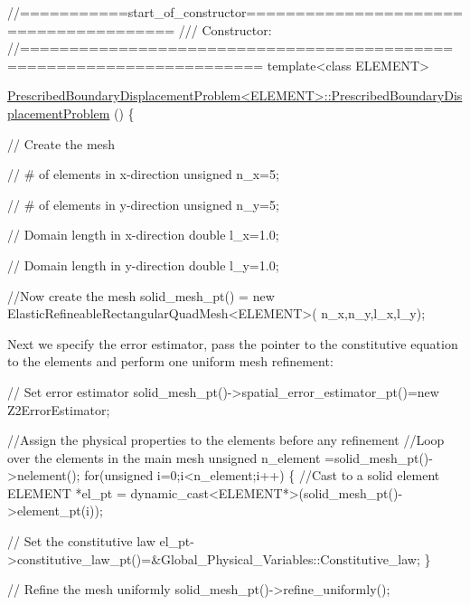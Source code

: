  
\begin{DoxyCodeInclude}
\textcolor{comment}{//===========start\_of\_constructor======================================= }
\textcolor{comment}{/// Constructor: }
\textcolor{comment}{}\textcolor{comment}{//====================================================================== }
\textcolor{keyword}{template}<\textcolor{keyword}{class} ELEMENT>

      \hyperlink{classPrescribedBoundaryDisplacementProblem_ac0c8b47eeb75ba2c618757e6b56e62dc}{PrescribedBoundaryDisplacementProblem<ELEMENT>::PrescribedBoundaryDisplacementProblem}
      () 
\{

 \textcolor{comment}{// Create the mesh}

 \textcolor{comment}{// # of elements in x-direction}
 \textcolor{keywordtype}{unsigned} n\_x=5;

 \textcolor{comment}{// # of elements in y-direction}
 \textcolor{keywordtype}{unsigned} n\_y=5;

 \textcolor{comment}{// Domain length in x-direction}
 \textcolor{keywordtype}{double} l\_x=1.0;

 \textcolor{comment}{// Domain length in y-direction}
 \textcolor{keywordtype}{double} l\_y=1.0;

 \textcolor{comment}{//Now create the mesh }
 solid\_mesh\_pt() = \textcolor{keyword}{new} ElasticRefineableRectangularQuadMesh<ELEMENT>(
  n\_x,n\_y,l\_x,l\_y);

\end{DoxyCodeInclude}


Next we specify the error estimator, pass the pointer to the constitutive equation to the elements and perform one uniform mesh refinement\+:


\begin{DoxyCodeInclude}

 \textcolor{comment}{// Set error estimator}
 solid\_mesh\_pt()->spatial\_error\_estimator\_pt()=\textcolor{keyword}{new} Z2ErrorEstimator;

 \textcolor{comment}{//Assign the physical properties to the elements before any refinement}
 \textcolor{comment}{//Loop over the elements in the main mesh}
 \textcolor{keywordtype}{unsigned} n\_element =solid\_mesh\_pt()->nelement();
 \textcolor{keywordflow}{for}(\textcolor{keywordtype}{unsigned} i=0;i<n\_element;i++)
  \{
   \textcolor{comment}{//Cast to a solid element}
   ELEMENT *el\_pt = \textcolor{keyword}{dynamic\_cast<}ELEMENT*\textcolor{keyword}{>}(solid\_mesh\_pt()->element\_pt(i));
   
   \textcolor{comment}{// Set the constitutive law}
   el\_pt->constitutive\_law\_pt()=&Global\_Physical\_Variables::Constitutive\_law;
  \}

 \textcolor{comment}{// Refine the mesh uniformly}
 solid\_mesh\_pt()->refine\_uniformly();

\end{DoxyCodeInclude}


